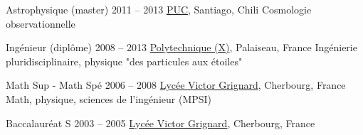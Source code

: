 \def\tbflanguage{french}
\def\tbfbordertop{1}
\def\tbfborderleft{0.7}








\begin{coordinatelist}
\end{coordinatelist}




\begin{yearlist}[7.7][\tbfborderleft][4]


\item[Astrophysique (master)]{2011 -- 2013}
	{
	\href{http://www.uc.cl/}{PUC}, Santiago, Chili
  }
  {    Cosmologie observationnelle}


\item[Ingénieur (diplôme)]{2008 -- 2013}
	{
  \href{https://www.polytechnique.edu/}{Polytechnique (X)}, Palaiseau, France}
  {    Ingénierie pluridisciplinaire, physique "des particules aux étoiles"}


\item[Math Sup - Math Spé]{2006 -- 2008}
	{
	\href{http://www.lycee-grignard.fr/}{Lyc\'ee Victor Grignard}, Cherbourg, France
	}
	{    Math, physique, sciences de l'ingénieur (MPSI)}


\item[Baccalauréat S]{2003 -- 2005}
	{
	\href{http://www.lycee-grignard.fr/}{Lyc\'ee Victor Grignard}, Cherbourg, France
	}
  {\vspace{-0.5cm}}

\end{yearlist}



